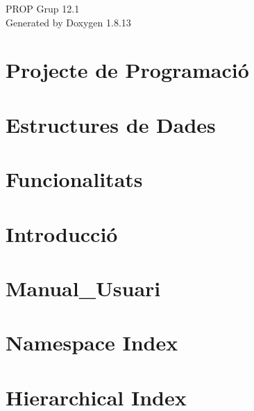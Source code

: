 \documentclass[twoside]{book}
\newcommand{\+}{\discretionary{\mbox{\scriptsize$\hookleftarrow$}}{}{}}
\newcommand{\clearemptydoublepage}{%
  \newpage{\pagestyle{empty}\cleardoublepage}%
}
\begin{document}
\hypersetup{pageanchor=false,
             bookmarksnumbered=true,
             pdfencoding=unicode
            }
\begin{titlepage}
\vspace*{7cm}
\begin{center}%
{\Large P\+R\+OP Grup 12.1 }\\
\vspace*{1cm}
{\large Generated by Doxygen 1.8.13}\\
\end{center}
\end{titlepage}
\clearemptydoublepage
{}
\tableofcontents
\clearemptydoublepage
{}
\hypersetup{pageanchor=true}

\chapter{Projecte de Programació}
\label{index}\hypertarget{index}{}
\chapter{Estructures de Dades}
\label{md_docs_HARDCODE_EDA}

\chapter{Funcionalitats}
\label{md_docs_HARDCODE_Funcionalitats}

\chapter{Introducció}
\label{md_docs_HARDCODE_Jocs_de_proves}

\chapter{Manual\+\_\+\+Usuari}
\label{md_docs_HARDCODE_Manual_Usuari}

\chapter{Namespace Index}

\chapter{Hierarchical Index}

\end{document}
